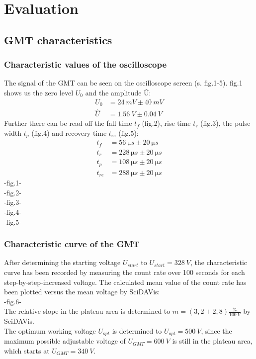 \chapter{Evaluation}
%
\section{GMT characteristics}
%
\subsection{Characteristic values of the oscilloscope}
%
The signal of the GMT can be seen on the oscilloscope screen (s. fig.1-5). fig.1 shows us the zero level $ U_{0} $ and
the amplitude $ Û $:
%
\begin{align*}
    U_{0}&=\SI{24}{mV} \pm \SI{40}{mV} \\
    \hat{U}&=\SI{1,56}{V} \pm \SI{0,04}{V}
\end{align*}
%
Further there can be read off the fall time $ t_{f} $ (fig.2), rise time $ t_{r} $ (fig.3), the pulse width $ t_{p} $
(fig.4) and recovery time $ t_{re} $ (fig.5):
\begin{align*}
    t_{f}&=\SI{56}{\micro s} \pm \SI{20}{\micro s} \\
    t_{r}&=\SI{228}{\micro s} \pm \SI{20}{\micro s} \\
    t_{p}&=\SI{108}{\micro s} \pm \SI{20}{\micro s} \\
    t_{re}&=\SI{288}{\micro s} \pm \SI{20}{\micro s}
\end{align*}
-fig.1-\\
-fig.2-\\
-fig.3-\\
-fig.4-\\
-fig.5-
%
\subsection{Characteristic curve of the GMT}
%
After determining the starting voltage $ U_{start} $ to $ U_{start}=\SI{328}{V} $, the characteristic curve has been
recorded by measuring the count rate over 100 seconds for each step-by-step-increased voltage. The calculated mean value
of the count rate has been plotted versus the mean voltage by SciDAVis:\\
-fig.6-\\
The relative slope in the plateau area is determined to $ m=(3,2\pm 2,8) \frac{\%}{\SI{100}{V}} $ by SciDAVis.\\
The optimum working voltage $ U_{opt} $ is determined to $ U_{opt}=\SI{500}{V} $, since the maximum possible adjustable
voltage of $ U_ {GMT}=\SI{600}{V} $ is still in the plateau area, which starts at $ U_{GMT}=\SI{340}{V} $.
%
